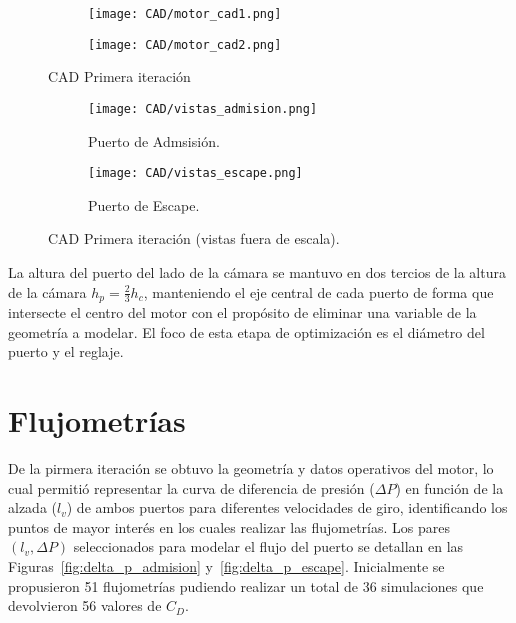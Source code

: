 \begin{figure}[h!]
  \centering
    \begin{subfigure}{0.4\textwidth}
        \centering
        \texttt{[image: CAD/motor\_cad1.png]}
    \end{subfigure}
    \hfill
    \begin{subfigure}{0.4\textwidth}
        \centering
        \texttt{[image: CAD/motor\_cad2.png]}
    \end{subfigure}
  \caption{CAD Primera iteración}\label{fig:motor_cad1}
\end{figure}


\begin{figure}[h!]
  \centering
    \begin{subfigure}{0.8\textwidth}
        \centering
        \texttt{[image: CAD/vistas\_admision.png]}
        \caption{Puerto de Admsisión.}
    \end{subfigure}
    \begin{subfigure}{0.8\textwidth}
        \centering
        \texttt{[image: CAD/vistas\_escape.png]}
        \caption{Puerto de Escape.}
    \end{subfigure}
  \caption{CAD Primera iteración (vistas fuera de escala).}\label{fig:motor_cad2}
\end{figure}

La altura del puerto del lado de la cámara se mantuvo en dos tercios de la
altura de la cámara $h_{p} = \frac{2}{3}h_{c}$, manteniendo el eje central de cada
puerto de forma que intersecte el centro del motor con el propósito de eliminar
una variable de la geometría a modelar.
%
El foco de esta etapa de optimización es el diámetro del puerto y el reglaje.
%


\section{Flujometrías}

De la pirmera iteración se obtuvo la geometría y datos operativos del motor, lo
cual permitió representar la curva de diferencia de presión ($\Delta P$) en
función de la alzada ($l_{v}$) de ambos puertos para diferentes velocidades de
giro, identificando los puntos de mayor interés en los cuales realizar las
flujometrías.
%
Los pares $(l_{v}, \Delta P)$ seleccionados para modelar el flujo del puerto se
detallan en las Figuras~\ref{fig:delta_p_admision} y~\ref{fig:delta_p_escape}.
%
Inicialmente se propusieron 51 flujometrías pudiendo realizar un total de 36
simulaciones que devolvieron 56 valores de $C_{D}$.

